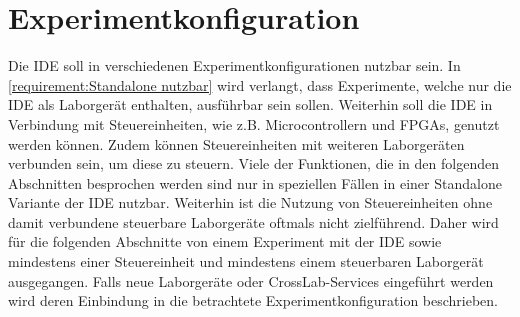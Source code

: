 \section{Experimentkonfiguration}\label{section:konzeption:experimentkonfiguration}

Die IDE soll in verschiedenen Experimentkonfigurationen nutzbar sein. In \autoref{requirement:Standalone nutzbar} wird verlangt, dass Experimente, welche nur die IDE als Laborgerät enthalten, ausführbar sein sollen. Weiterhin soll die IDE in Verbindung mit Steuereinheiten, wie z.B. Microcontrollern und FPGAs, genutzt werden können. Zudem können Steuereinheiten mit weiteren Laborgeräten verbunden sein, um diese zu steuern. Viele der Funktionen, die in den folgenden Abschnitten besprochen werden sind nur in speziellen Fällen in einer Standalone Variante der IDE nutzbar. Weiterhin ist die Nutzung von Steuereinheiten ohne damit verbundene steuerbare Laborgeräte oftmals nicht zielführend. Daher wird für die folgenden Abschnitte von einem Experiment mit der IDE sowie mindestens einer Steuereinheit und mindestens einem steuerbaren Laborgerät ausgegangen. Falls neue Laborgeräte oder CrossLab-Services eingeführt werden wird deren Einbindung in die betrachtete Experimentkonfiguration beschrieben.